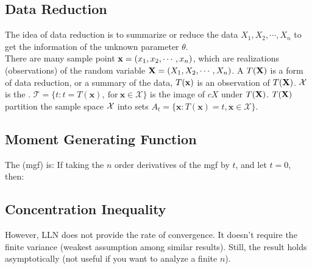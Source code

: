 \documentclass[10pt]{report}
\begin{document}
\subsection{Data Reduction}

The idea of data reduction is to summarize or reduce the data $X_1, X_2,\cdots, X_n$ to get the information of the unknown parameter $\theta$.\\
There are many sample point $\bold{x}=(x_1,x_2,\cdots,x_n)$, which are realizations (observations) of the random variable $\bold{X}=(X_1,X_2,\cdots,X_n)$.
A  $T(\bold{X})$ is a form of data reduction, or a summary of the data, $T(\bold{x})$ is an observation of $T(\bold{X})$. $\mathcal{X}$ is
the . $\mathcal{T}=\{t:t=T(\mathbf{x}),\mathrm{~for~}\mathbf{x}\in\mathcal{X}\}$ is the image of $cX$ under $T(\bold{X})$.
$T(\bold{X})$ partition the sample space $\mathcal{X}$ into sets $A_t=\{\mathbf{x}:T(\mathbf{x})=t,\mathbf{x}\in\mathcal{X}\}$.

\subsection{Moment Generating Function}
The  (mgf) is:
If taking the $n$ order derivatives of the mgf by $t$, and let $t=0$, then:

\subsection{Concentration Inequality}\label{subsec:concentration_inequality}
\begin{center}
\end{center}
However, LLN does not provide the rate of convergence. It doesn’t require the finite variance (weakest assumption among similar results). 
Still, the result holds asymptotically (not useful if you want to analyze a finite $n$).
\end{document}
